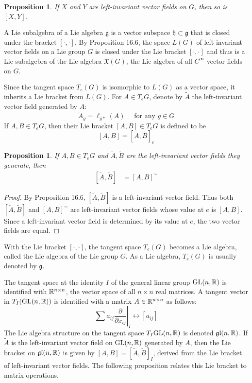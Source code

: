 \documentclass{amsart}
\let\originalmathbb\mathbb
\renewcommand{\mathbb}[1]{%
    \ifstrequal{#1}{1}{\mathbbm{#1}}{\originalmathbb{#1}}%
}
\theoremstyle{plain}
\newtheorem{proposition}[theorem]{Proposition}
\theoremstyle{definition}
\theoremstyle{remark}
\begin{document}
\begin{proposition}
If $X$ and $Y$ are left-invariant vector fields on $G$, then so is $[X, Y]$.
\end{proposition}
A Lie subalgebra of a Lie algebra $\mathfrak{g}$ is a vector subspace $\mathfrak{h} \subset \mathfrak{g}$ that is closed under the bracket $[\cdot, \cdot]$. By Proposition 16.6, the space $L(G)$ of left-invariant vector fields on a Lie group $G$ is closed under the Lie bracket $[\cdot, \cdot]$ and thus is a Lie subalgebra of the Lie algebra $\mathfrak{X}(G)$, the Lie algebra of all $C^{\infty}$ vector fields on $G$.

Since the tangent space $T_e(G)$ is isomorphic to $L(G)$ as a vector space, it inherits a Lie bracket from $L(G)$. For $A \in T_e G$, denote by $\tilde{A}$ the left-invariant vector field generated by $A$:
\[
\tilde{A}_g=\ell_{g *}(A) \quad \text { for any } g \in G
\]
If $A, B \in T_e G$, then their Lie bracket $[A, B] \in T_e G$ is defined to be
\[
[A, B]=[\tilde{A}, \tilde{B}]_e
\]
\begin{proposition}
If $A, B \in T_e G$ and $\tilde{A}, \tilde{B}$ are the left-invariant vector fields they generate, then
\[
\begin{align*} [\tilde{A}, \tilde{B}] &= [A, B]^{\sim} \end{align*}
\]
\end{proposition}
\begin{proof}
By Proposition 16.6, $[\tilde{A}, \tilde{B}]$ is a left-invariant vector field. Thus both $[\tilde{A}, \tilde{B}]$ and $[A, B]^{\sim}$ are left-invariant vector fields whose value at $e$ is $[A, B]$. Since a left-invariant vector field is determined by its value at $e$, the two vector fields are equal.
\end{proof}

With the Lie bracket $[\cdot, \cdot]$, the tangent space $T_e(G)$ becomes a Lie algebra, called the Lie algebra of the Lie group $G$. As a Lie algebra, $T_e(G)$ is usually denoted by $\mathfrak{g}$.

The tangent space at the identity $I$ of the general linear group $\mathrm{GL}(n, \mathbb{R})$ is identified with $\mathbb{R}^{n \times n}$, the vector space of all $n \times n$ real matrices. A tangent vector in $T_I(\mathrm{GL}(n, \mathbb{R}))$ is identified with a matrix $A \in \mathbb{R}^{n \times n}$ as follows:
\[
\left.\sum a_{i j} \frac{\partial}{\partial x_{i j}}\right|_I \longleftrightarrow\left[a_{i j}\right]
\]
The Lie algebra structure on the tangent space $T_I \mathrm{GL}(n, \mathbb{R})$ is denoted $\mathfrak{g l}(n, \mathbb{R})$. If $\tilde{A}$ is the left-invariant vector field on $\operatorname{GL}(n, \mathbb{R})$ generated by $A$, then the Lie bracket on $\mathfrak{g l}(n, \mathbb{R})$ is given by $[A, B]=[\tilde{A}, \tilde{B}]_I$, derived from the Lie bracket of left-invariant vector fields. The following proposition relates this Lie bracket to matrix operations.
\end{document}
